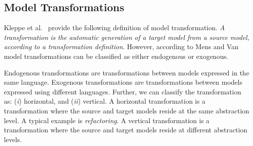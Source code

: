 



\subsection{Model Transformations}\label{sec:m2m}

Kleppe et al.~\cite{Kleppe:2003} provide the following definition of model transformation. \textit{A
transformation is the automatic generation of a target model from a source
model, according to a transformation definition}. 
However, according to Mens and Van~\cite{Mens:2006:TMT:1706639.1706924} model transformations can be classified as either endogenous or exogenous. 

Endogenous transformations are transformations between
models expressed in the same language. Exogenous transformations are
transformations between models expressed using different languages. Further, we can classify the transformation as: (\textit{i}) horizontal, and (\textit{ii}) vertical. A horizontal transformation
is a transformation where the source and target models reside at the same abstraction
level. A typical example is \textit{refactoring}. A vertical transformation is a transformation where the source and target
models reside at different abstraction levels.

